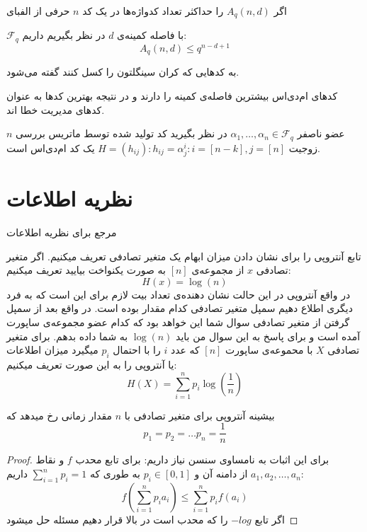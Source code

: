 \begin{definition}
	اگر
	$A_q(n, d)$
	را حداکثر تعداد کدواژه‌ها در یک کد
	$n$
	حرفی از الفبای
	
	$\mathcal{F}_q$
	با فاصله کمینه‌ی 
	$d$
	در نظر بگیریم داریم:
	\begin{equation}
		A_q(n, d) \leq q^{n - d + 1}
	\end{equation}
	\cite{wiki:Singleton}
\end{definition}
\begin{definition}[
	کد
	\lr{mds}
	]
	\label{def:mds}
	به کدهایی که کران سینگلتون را کسل کنند گفته می‌شود.
\end{definition}

کدهای ام‌دی‌اس بیشترین فاصله‌ی کمینه را دارند و در نتیجه بهترین کدها به عنوان کدهای مدیریت خطا اند.
\begin{example}
	$n$
	عضو ناصفر
	$\alpha_1, \ldots, \alpha_n \in \mathcal{F}_q$
	در نظر بگیرید کد تولید شده توسط ماتریس بررسی زوجیت 
	$H = (h_{ij}): h_{ij} = \alpha_j^i: i = [n - k], j = [n]$
	یک کد ام‌دی‌اس است.
\end{example}
\section{
    ‌نظریه اطلاعات
}
مرجع برای نظریه اطلاعات
\cite{book:info}

تابع آنتروپی را برای نشان دادن میزان ابهام یک متغیر تصادفی تعریف میکنیم. اگر متغیر تصادفی
$x$
از مجموعه‌ی
$[n]$
به صورت یکنواخت بیایید تعریف میکنیم:
$$H(x) = \log(n)$$
در واقع آنتروپی در این حالت نشان دهنده‌ی تعداد بیت لازم برای این است که به فرد دیگری اطلاع دهیم سمپل متغیر تصادفی کدام مقدار بوده است. در واقع بعد از سمپل گرفتن از متغیر تصادفی سوال شما این خواهد بود که کدام عضو مجموعه‌ی ساپورت آمده است و برای پاسخ به این سوال من باید
$\log(n)$
به شما داده بدهم.
برای متغیر تصادفی
$X$
با محموعه‌ی ساپورت
$[n]$
که عدد
$i$
را با احتمال
$p_i$
میگیرد میزان اطلاعات یا آنتروپی را به این صورت تعریف میکنیم:
$$H(X) = \sum_{i = 1}^{n} p_i \log(\frac{1}{n})$$

\begin{theorem}
بیشینه آنتروپی برای متغیر تصادفی با
$n$
مقدار زمانی رخ میدهد که
$$p_1 = p_2 = \dots p_n = \frac{1}{n}$$
\end{theorem}
\begin{proof}
برای این اثبات به نامساوی سنسن نیاز داریم: برای تابع محدب
$f$
و نقاط
$a_1, a_2, \dots, a_n$
از دامنه آن و
$p_i \in [0, 1]$
به طوری که
$\sum_{i = 1}^{n} p_i = 1$
داریم:
$$f(\sum_{i = 1}^{n} p_i a_i) \leq \sum_{i = 1}^{n} p_i f(a_i)$$
اگر تابع
$- log$
را که محدب است در بالا قرار دهیم مسئله حل میشود
\end{proof}

